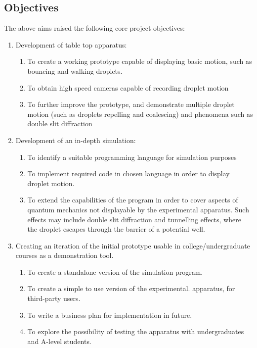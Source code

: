 \subsection{Objectives}
The above aims raised the following core project objectives: 
\begin{enumerate}
   \item Development of table top apparatus: 
   \begin{enumerate}
     \item To create a working prototype capable of displaying basic  motion, such as bouncing and walking droplets.
     \item To obtain high speed cameras capable of recording droplet motion
     \item To further improve the prototype, and demonstrate multiple droplet motion (such as droplets repelling and coalescing) and phenomena such as double slit diffraction
    \end{enumerate}
   \item Development of an in-depth simulation:
   \begin{enumerate}
    \item To identify a suitable programming language for simulation purposes
     \item To implement required code in chosen language in order to display droplet motion.
     \item To extend the capabilities of the program in order to cover aspects of quantum mechanics not displayable by the experimental apparatus. Such effects may include double slit diffraction and tunnelling effects, where the droplet escapes through the barrier of a potential well.
    \end{enumerate}
    \item Creating an iteration of the initial prototype usable in college/undergraduate courses as a demonstration tool.  
   \begin{enumerate}
     \item To create a standalone version of the simulation program.
     \item To create a simple to use version of the experimental. apparatus, for third-party users.
     \item To write a business plan for implementation in future.
     \item To explore the possibility of testing the apparatus with undergraduates and A-level students.
    \end{enumerate}
\end{enumerate}
